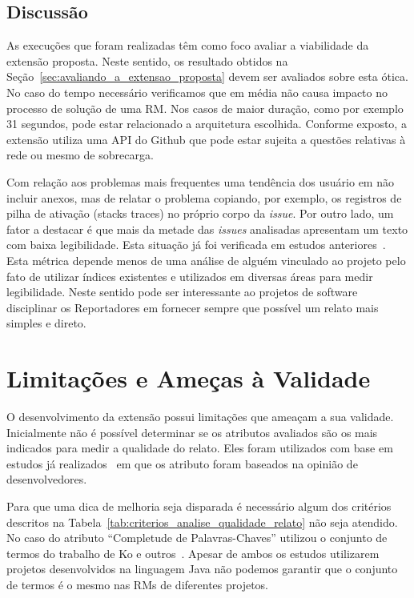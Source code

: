 \subsection{Discussão}
\label{sub:implemtacao_extensao_avaliacao_discussao}

As execuções que foram realizadas têm como foco avaliar a viabilidade da
extensão proposta. Neste sentido, os resultado obtidos na
Seção~\ref{sec:avaliando_a_extensao_proposta} devem ser avaliados sobre esta
ótica. No caso do tempo necessário verificamos que em média não causa impacto no
processo de solução de uma RM\@. Nos casos de maior duração, como por exemplo 31
segundos, pode estar relacionado a arquitetura escolhida. Conforme exposto, a
extensão utiliza uma API do Github que pode estar sujeita a questões relativas à
rede ou mesmo de sobrecarga.

Com relação aos problemas mais frequentes uma tendência dos usuário em não
incluir anexos, mas de relatar o problema copiando, por exemplo, os registros de
pilha de ativação (stacks traces) no próprio corpo da \textit{issue}. Por outro
lado, um fator a destacar é que mais da metade das \textit{issues} analisadas
apresentam um texto com baixa legibilidade. Esta situação já foi verificada em
estudos anteriores~\cite{ko2006linguistic, bettenburg2007quality}. Esta métrica
depende menos de uma análise de alguém vinculado ao projeto pelo fato de
utilizar índices existentes e utilizados em diversas áreas para medir
legibilidade. Neste sentido pode ser interessante ao projetos de software
disciplinar os Reportadores em fornecer sempre que possível um relato mais
simples e direto.

\section{Limitações e Ameças à Validade}
\label{sec:limitações_e_ameças_à_validade}

O desenvolvimento da extensão possui limitações que ameaçam a sua validade.
Inicialmente não é possível determinar se os atributos avaliados são os mais
indicados para medir a qualidade do relato. Eles foram utilizados com base em
estudos já realizados~\cite{bettenburg2007quality} em que os atributo foram
baseados na opinião de desenvolvedores.

Para que uma dica de melhoria seja disparada é necessário algum dos critérios
descritos na Tabela~\ref{tab:criterios_analise_qualidade_relato} não seja
atendido. No caso do atributo ``Completude de Palavras-Chaves'' utilizou o
conjunto de termos do trabalho de Ko e outros~\cite{ko2006linguistic}. Apesar de
ambos os estudos utilizarem projetos desenvolvidos na linguagem Java não podemos
garantir que o conjunto de termos é o mesmo nas RMs de diferentes projetos.

